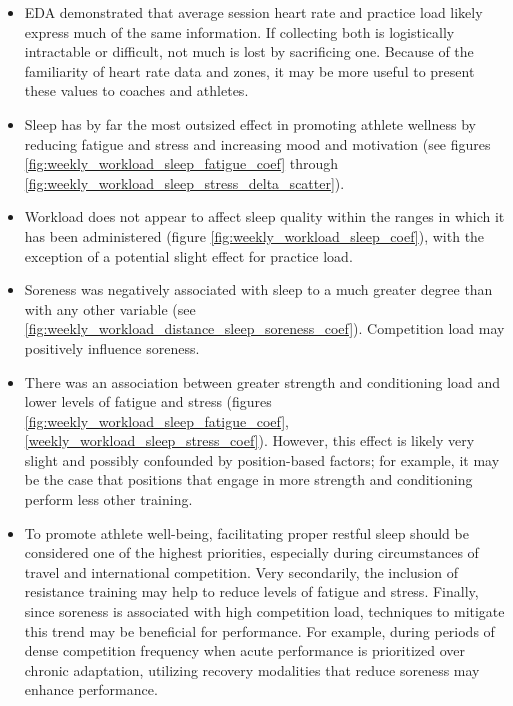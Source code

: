 \documentclass{article}
\begin{document}
			\begin{itemize}
				\item EDA demonstrated that average session heart rate and
				practice load likely express much of the same information.
				If collecting both is logistically intractable or difficult,
				not much is lost by sacrificing one. Because of the familiarity
				of heart rate data and zones, it may be more useful to present
				these values to coaches and athletes.
				\item Sleep has by far the most outsized effect in promoting
				athlete wellness by reducing fatigue and stress and increasing
				mood and motivation (see figures
				\ref{fig:weekly_workload_sleep_fatigue_coef} through
				\ref{fig:weekly_workload_sleep_stress_delta_scatter}).
				\item Workload does not appear to affect sleep quality within
				the ranges in which it has been administered (figure
				\ref{fig:weekly_workload_sleep_coef}), with the exception of a potential
				slight effect for practice load.
				\item Soreness was negatively associated with sleep to a much
				greater degree than with any other variable (see
				\ref{fig:weekly_workload_distance_sleep_soreness_coef}).
				Competition load may positively influence soreness.
				\item There was an association between greater
				strength and conditioning load and lower levels of fatigue
				and stress (figures \ref{fig:weekly_workload_sleep_fatigue_coef},
				\ref{weekly_workload_sleep_stress_coef}).
				However, this effect is likely very slight and possibly
				confounded by position-based factors; for example, it may be
				the case that positions that engage in more strength and
				conditioning perform less other training.
				\item To promote athlete well-being, facilitating proper
				restful sleep should be considered one of the highest priorities,
				especially during circumstances of travel and international
				competition. Very
				secondarily, the inclusion of resistance training may help to
				reduce levels of fatigue and stress. Finally, since soreness is
				associated with high competition load, techniques to mitigate
				this trend may be beneficial for performance. For example,
				during periods of dense competition frequency when acute
				performance is prioritized over chronic adaptation, utilizing
				recovery modalities that reduce soreness may enhance performance.
			\end{itemize}
\end{document}
